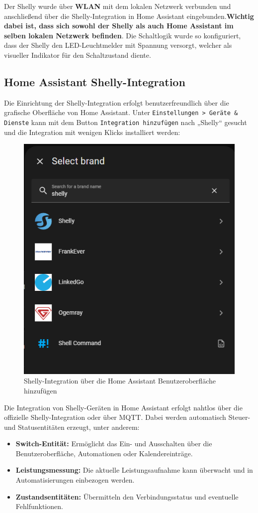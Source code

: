 Der Shelly wurde über \textbf{WLAN} mit dem lokalen Netzwerk verbunden und anschließend über die Shelly-Integration in Home Assistant eingebunden.\textbf{Wichtig dabei ist, dass sich sowohl der Shelly als auch Home Assistant im selben lokalen Netzwerk befinden}. Die Schaltlogik wurde so konfiguriert, dass der Shelly den LED-Leuchtmelder mit Spannung versorgt, welcher als visueller Indikator für den Schaltzustand diente.



\subsection{Home Assistant Shelly-Integration}

Die Einrichtung der Shelly-Integration erfolgt benutzerfreundlich über die grafische Oberfläche von Home Assistant. Unter \texttt{Einstellungen > Geräte \& Dienste} kann mit dem Button \texttt{Integration hinzufügen} nach „Shelly“ gesucht und die Integration mit wenigen Klicks installiert werden:

\begin{figure}[H]
  \centering
  \includegraphics[width=0.65\linewidth]{images/add_shelly_integration.png}
  \caption{Shelly-Integration über die Home Assistant Benutzeroberfläche hinzufügen}
\end{figure}

Die Integration von Shelly-Geräten in Home Assistant erfolgt nahtlos über die offizielle Shelly-Integration oder über MQTT. Dabei werden automatisch Steuer- und Statusentitäten erzeugt, unter anderem:
\begin{itemize}
  \item \textbf{Switch-Entität:} Ermöglicht das Ein- und Ausschalten über die Benutzeroberfläche, Automationen oder Kalendereinträge.\\
  \item \textbf{Leistungsmessung:} Die aktuelle Leistungsaufnahme kann überwacht und in Automatisierungen einbezogen werden.\\
  \item \textbf{Zustandsentitäten:} Übermitteln den Verbindungsstatus und eventuelle Fehlfunktionen.\\
\end{itemize}

